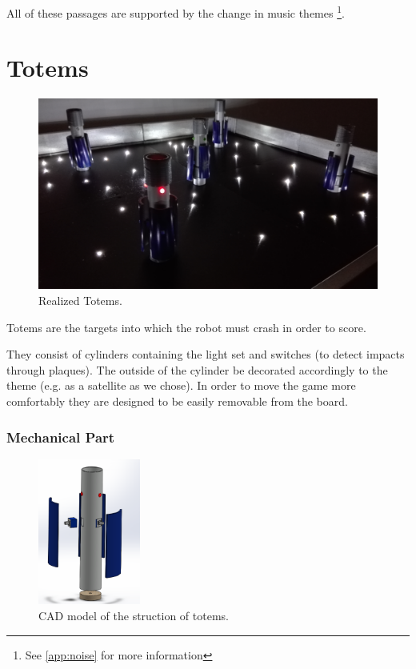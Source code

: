 \documentclass[a4paper,twoside]{book}
\begin{document}
All of these passages are supported by the change in music themes 
\footnote {See \autoref{app:noise} for more information}.


\section{Totems}

\begin{figure}[h]
\includegraphics[width=\linewidth]{img/IMG_20160616_111854} 
\caption{Realized Totems.}
\end{figure}

Totems are the targets into which the robot must crash in order to score.

They consist of cylinders containing the light set and switches (to detect impacts through plaques). The outside of the cylinder be decorated accordingly to the theme (e.g. as a satellite as we chose). In order to move the game more comfortably they are designed to be easily removable from the board.

\subsubsection{Mechanical Part}

\begin{figure} 
    \centering
    \includegraphics[width=0.3\textwidth]{img/totem_nuovo1}
    \caption{CAD model of the struction of totems.}
\end{figure}
\end{document}
